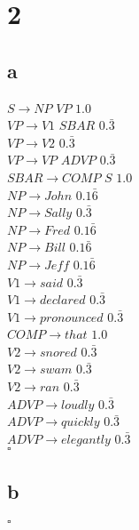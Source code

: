 \documentclass[twoside]{homework}
\begin{document}
\section*{2}
\subsection*{a}
$S \rightarrow NP$ $VP$ $1.0$ \\
$VP \rightarrow V1$ $SBAR$ $0.\bar{3}$ \\
$VP \rightarrow V2$ $0.\bar{3}$ \\
$VP \rightarrow VP$ $ADVP$ $0.\bar{3}$ \\
$SBAR \rightarrow COMP$ $S$ $1.0$ \\
$NP \rightarrow John$ $0.1\bar{6}$ \\
$NP \rightarrow Sally$ $0.\bar{3}$ \\
$NP \rightarrow Fred$ $0.1\bar{6}$ \\
$NP \rightarrow Bill$ $0.1\bar{6}$ \\
$NP \rightarrow Jeff$ $0.1\bar{6}$ \\
$V1 \rightarrow said$ $0.\bar{3}$ \\
$V1 \rightarrow declared$ $0.\bar{3}$ \\
$V1 \rightarrow pronounced$ $0.\bar{3}$ \\
$COMP \rightarrow that$ $1.0$ \\
$V2 \rightarrow snored$ $0.\bar{3}$ \\
$V2 \rightarrow swam$ $0.\bar{3}$ \\
$V2 \rightarrow ran$ $0.\bar{3}$ \\
$ADVP \rightarrow loudly$ $0.\bar{3}$ \\
$ADVP \rightarrow quickly$ $0.\bar{3}$ \\
$ADVP \rightarrow elegantly$ $0.\bar{3}$ \\
$\square$ 
\subsection*{b}
\vspace{160mm}
$\square$
\end{document}
